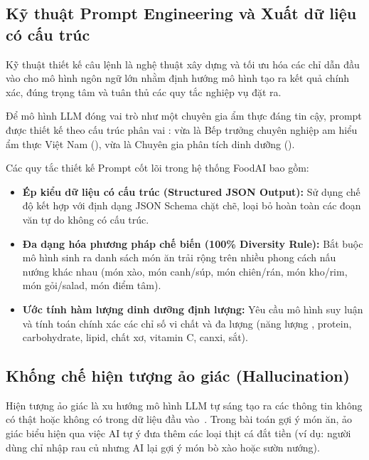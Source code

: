 \subsection{Kỹ thuật Prompt Engineering và Xuất dữ liệu có cấu trúc}

Kỹ thuật thiết kế câu lệnh  là nghệ thuật xây dựng và tối ưu hóa các chỉ dẫn đầu vào cho mô hình ngôn ngữ lớn nhằm định hướng mô hình tạo ra kết quả chính xác, đúng trọng tâm và tuân thủ các quy tắc nghiệp vụ đặt ra.

\begin{ghinho}
Để mô hình LLM đóng vai trò như một chuyên gia ẩm thực đáng tin cậy, prompt được thiết kế theo cấu trúc phân vai : vừa là Bếp trưởng chuyên nghiệp am hiểu ẩm thực Việt Nam (), vừa là Chuyên gia phân tích dinh dưỡng ().
\end{ghinho}

Các quy tắc thiết kế Prompt cốt lõi trong hệ thống FoodAI bao gồm:
\begin{itemize}[leftmargin=1.6em, itemsep=2pt]
  \item \textbf{Ép kiểu dữ liệu có cấu trúc (Structured JSON Output):} Sử dụng chế độ  kết hợp với định dạng JSON Schema chặt chẽ, loại bỏ hoàn toàn các đoạn văn tự do không có cấu trúc.
  \item \textbf{Đa dạng hóa phương pháp chế biến (100\% Diversity Rule):} Bắt buộc mô hình sinh ra danh sách món ăn trải rộng trên nhiều phong cách nấu nướng khác nhau (món xào, món canh/súp, món chiên/rán, món kho/rim, món gỏi/salad, món điểm tâm).
  \item \textbf{Ước tính hàm lượng dinh dưỡng định lượng:} Yêu cầu mô hình suy luận và tính toán chính xác các chỉ số vi chất và đa lượng (năng lượng , protein, carbohydrate, lipid, chất xơ, vitamin C, canxi, sắt).
\end{itemize}

\subsection{Khống chế hiện tượng ảo giác (Hallucination)}

Hiện tượng ảo giác  là xu hướng mô hình LLM tự sáng tạo ra các thông tin không có thật hoặc không có trong dữ liệu đầu vào~\cite{Ji2023Hallucination}. Trong bài toán gợi ý món ăn, ảo giác biểu hiện qua việc AI tự ý đưa thêm các loại thịt cá đắt tiền (ví dụ: người dùng chỉ nhập rau củ nhưng AI lại gợi ý món bò xào hoặc sườn nướng).

